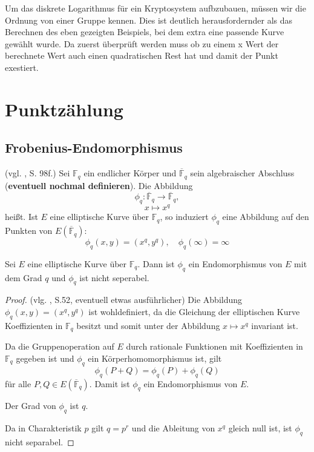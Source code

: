     Um das diskrete Logarithmus für ein Kryptosystem aufbzubauen, müssen wir die Ordnung von einer Gruppe kennen. Dies ist deutlich herausfordernder als das Berechnen des eben gezeigten Beispiels, bei dem extra eine passende Kurve gewählt wurde. Da zuerst überprüft werden muss ob zu einem x Wert der berechnete Wert auch einen quadratischen Rest hat und damit der Punkt exestiert.
\section{Punktzählung}
\subsection{Frobenius-Endomorphismus} 
    \begin{definition}(vgl. \cite{washington08}, S. 98f.)
        Sei $\mathbb{F}_q$ ein endlicher Körper und $\overline{\mathbb{F}}_q$ sein algebraischer Abschluss (\textbf{eventuell nochmal definieren}). Die Abbildung
        \[
        \phi_q:\overline{\mathbb{F}}_q\rightarrow\overline{\mathbb{F}}_q,\]
        \[
        x \mapsto x^q
        \]
        heißt.
        Ist $E$ eine elliptische Kurve über $\mathbb{F}_q$, so induziert $\phi_q$ eine Abbildung auf den Punkten von $E(\overline{\mathbb{F}}_q)$:
        \[
        \phi_q(x,y)=(x^q,y^q), \quad \phi_q(\infty )= \infty
        \]
        
    \end{definition}
    \begin{lemma}
        Sei $E$ eine elliptische Kurve über \(\mathbb{F}_q\). Dann ist $\phi_q$ ein Endomorphismus von $E$ mit dem Grad $q$ und $\phi_q$ ist nicht seperabel.
    \end{lemma}
    \begin{proof} (vlg. \cite{washington08}, S.52, eventuell etwas ausführlicher)
    Die Abbildung $\phi_q(x,y) = (x^q, y^q)$ ist wohldefiniert, da die Gleichung der elliptischen Kurve Koeffizienten in $\mathbb{F}_q$ besitzt und somit unter der Abbildung $x \mapsto x^q$ invariant ist.
    
    Da die Gruppenoperation auf $E$ durch rationale Funktionen mit Koeffizienten in $\mathbb{F}_q$ gegeben ist und $\phi_q$ ein Körperhomomorphismus ist, gilt
    \[
    \phi_q(P+Q) = \phi_q(P) + \phi_q(Q)
    \]
    für alle $P,Q \in E(\overline{\mathbb{F}}_q)$.
    Damit ist $\phi_q$ ein Endomorphismus von $E$.
    
    Der Grad von $\phi_q$ ist $q$.
    
    Da in Charakteristik $p$ gilt $q = p^r$ und die Ableitung von $x^q$ gleich null ist, ist $\phi_q$ nicht separabel.
    \end{proof}
    
